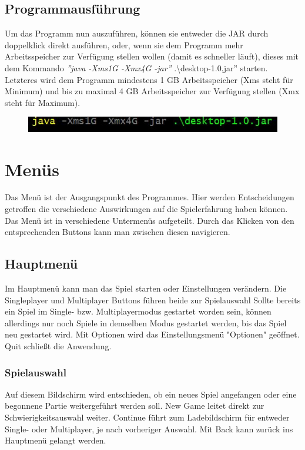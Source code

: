 \documentclass[fontsize=12pt,paper=a4,twoside]{scrartcl}
\begin{document}

\subsection{Programmausführung}

Um das Programm nun auszuführen, können sie entweder die JAR durch doppelklick direkt ausführen, oder, wenn sie dem Programm mehr Arbeitsspeicher zur Verfügung stellen wollen (damit es schneller läuft), dieses mit dem Kommando \textit{''java -Xms1G -Xmx4G -jar''} .\textbackslash desktop-1.0,jar'' starten. Letzteres wird dem Programm mindestens 1 GB Arbeitsspeicher  (Xms steht für Minimum) und bis zu maximal 4 GB Arbeitsspeicher zur Verfügung stellen (Xmx steht für Maximum).

\begin{figure}[h!]
\centering
\includegraphics[width=0.8\linewidth]{run_application.JPG}
\end{figure} 

\newpage
\section{Menüs}
Das Menü ist der Ausgangspunkt des Programmes. Hier werden Entscheidungen getroffen die verschiedene Auswirkungen auf die Spielerfahrung haben können.
Das Menü ist in verschiedene Untermenüs aufgeteilt. Durch das Klicken von den entsprechenden Buttons kann man zwischen diesen navigieren.

\subsection{Hauptmenü}
Im Hauptmenü kann man das Spiel starten oder Einstellungen verändern. Die Singleplayer und Multiplayer Buttons führen beide zur Spielauswahl
Sollte bereits ein Spiel im Single- bzw. Multiplayermodus gestartet worden sein, können allerdings nur noch Spiele in demselben Modus gestartet werden, bis das Spiel neu gestartet wird.
Mit Optionen wird das Einstellungsmenü "Optionen" geöffnet.
Quit schließt die Anwendung.

\subsubsection{Spielauswahl}
Auf diesem Bildschirm wird entschieden, ob ein neues Spiel angefangen oder eine begonnene Partie weitergeführt werden soll. New Game leitet direkt zur Schwierigkeitsauswahl weiter. Continue führt zum Ladebildschirm für entweder Single- oder Multiplayer, je nach vorheriger Auswahl.
Mit Back kann zurück ins Hauptmenü gelangt werden.
\end{document}
